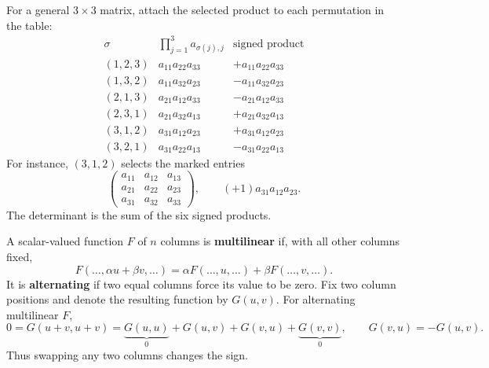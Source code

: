 For a general \(3\times3\) matrix, attach
the selected product to each permutation in the table:
\[
\begin{array}{c|c|c}
\sigma&\prod_{j=1}^3 a_{\sigma(j),j}&\text{signed product}\\ \hline
(1,2,3)&a_{11}a_{22}a_{33}&+a_{11}a_{22}a_{33}\\
(1,3,2)&a_{11}a_{32}a_{23}&-a_{11}a_{32}a_{23}\\
(2,1,3)&a_{21}a_{12}a_{33}&-a_{21}a_{12}a_{33}\\
(2,3,1)&a_{21}a_{32}a_{13}&+a_{21}a_{32}a_{13}\\
(3,1,2)&a_{31}a_{12}a_{23}&+a_{31}a_{12}a_{23}\\
(3,2,1)&a_{31}a_{22}a_{13}&-a_{31}a_{22}a_{13}
\end{array}
\]
For instance, \((3,1,2)\) selects the marked entries
\[
\begin{pmatrix}
a_{11}&\boxed{a_{12}}&a_{13}\\
a_{21}&a_{22}&\boxed{a_{23}}\\
\boxed{a_{31}}&a_{32}&a_{33}
\end{pmatrix},
\qquad (+1)a_{31}a_{12}a_{23}.
\]
The determinant is the sum of the six signed products.

A scalar-valued function \(F\) of \(n\)
columns is \textbf{multilinear} if, with all other columns fixed,
\[
F(\ldots,\alpha u+\beta v,\ldots)
=\alpha F(\ldots,u,\ldots)+\beta F(\ldots,v,\ldots).
\]
It is \textbf{alternating} if two equal columns force its value to be zero.
Fix two column positions and denote the resulting function by \(G(u,v)\).
For alternating multilinear \(F\),
\[
0=G(u+v,u+v)
=\underbrace{G(u,u)}_{0}+G(u,v)+G(v,u)+\underbrace{G(v,v)}_{0},
\qquad G(v,u)=-G(u,v).
\]
Thus swapping any two columns changes the sign.

